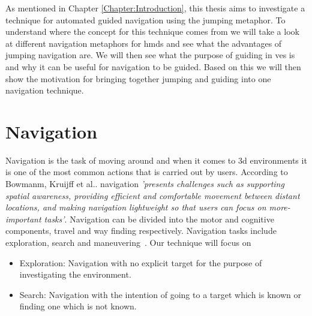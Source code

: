 \label{Chapter:Related Work}
As mentioned in Chapter \ref{Chapter:Introduction}, this thesis aims to investigate a technique for automated guided navigation using the jumping metaphor. To understand where the concept for this technique comes from we will take a look at different navigation metaphors for \acrshort{hmd}s and see what the advantages of jumping navigation are. We will then see what the purpose of guiding in \acrshort{ve}s is and why it can be useful for navigation to be guided. Based on this we will then show the motivation for bringing together jumping and guiding into one navigation technique. 

\section{Navigation}
\label{section RW: Navigation}

Navigation is the task of moving around and when it comes to \acrfull{3d} environments it is one of the most common actions that is carried out by users. According to Bowmanm, Kruijff et al.. navigation \textit{'presents challenges such as supporting spatial awareness, providing efficient and comfortable movement between distant locations, and making navigation lightweight so that users can focus on more-important tasks'}. Navigation can be divided into the motor and cognitive components, travel and way finding respectively. Navigation tasks include exploration, search and maneuvering~\cite{Bowman2001}. Our technique will focus on 
\begin{itemize}
	\item Exploration: Navigation with no explicit target for the purpose of investigating the environment.
	\item Search: Navigation with the intention of going to a target which is known or finding one which is not known.
\end{itemize}

